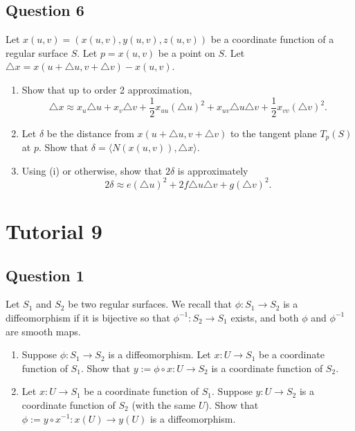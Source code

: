 \documentclass[12pt, a4paper]{article}
\newcommand{\inner}[1]{\langle #1 \rangle}
\begin{document}
\subsection*{Question 6}
Let $x(u,v)=(x(u,v),y(u,v),z(u,v))$ be a coordinate function of a regular surface $S$. Let $p=x(u,v)$ be a point on $S$. Let $\triangle x=x(u+\triangle u,v+\triangle v)-x(u,v)$.
\begin{enumerate}[label=(\roman*)]
    \item Show that up to order 2 approximation,
    \[ \triangle x\approx x_{u}\triangle u+x_{v}\triangle v+\frac{1}{2}x_{uu}(\triangle u)^{2}+x_{uv}\triangle u\triangle v+\frac{1}{2}x_{vv}(\triangle v)^{2}. \]
    \item Let $\delta$ be the distance from $x(u+\triangle u,v+\triangle v)$ to the tangent plane $T_{p}(S)$ at $p$. Show that $\delta=\inner{N(x(u,v)),\triangle x}$.
    \item Using (i) or otherwise, show that $2\delta$ is approximately
    \[ 2\delta\approx e(\triangle u)^{2}+2f\triangle u\triangle v+g(\triangle v)^{2}. \]
\end{enumerate}
\newpage

\section*{Tutorial 9}

\subsection*{Question 1}
Let $S_{1}$ and $S_{2}$ be two regular surfaces. We recall that $\phi:S_{1}\rightarrow S_{2}$ is a diffeomorphism if it is bijective so that $\phi^{-1}:S_{2}\rightarrow S_{1}$ exists, and both $\phi$ and $\phi^{-1}$ are smooth maps.
\begin{enumerate}[label=(\roman*)]
    \item Suppose $\phi:S_{1}\rightarrow S_{2}$ is a diffeomorphism. Let $x: U\rightarrow S_{1}$ be a coordinate function of $S_{1}$. Show that $y:=\phi\circ x:U\rightarrow S_{2}$ is a coordinate function of $S_{2}$.
    \item Let $x:U\rightarrow S_{1}$ be a coordinate function of $S_{1}$. Suppose $y:U\rightarrow S_{2}$ is a coordinate function of $S_{2}$ (with the same $U$). Show that $\phi:=y\circ x^{-1}:x(U)\rightarrow y(U)$ is a diffeomorphism.
\end{enumerate}
\newpage
\end{document}
